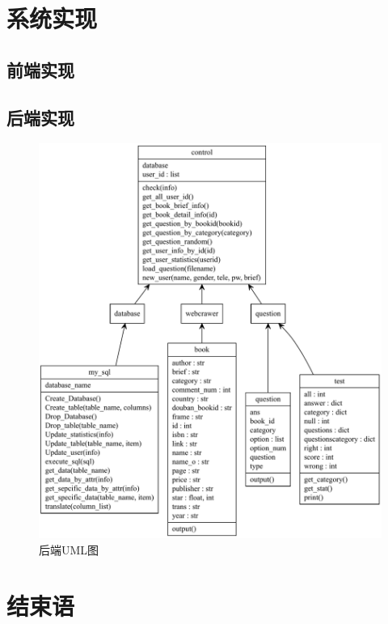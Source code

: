 \documentclass[twoside,11pt]{article}
\begin{document}
\section{系统实现}
\subsection{前端实现}
\subsection{后端实现}

\begin{figure}[htbp]
    \includegraphics[width=1\columnwidth]{figures/backenduml.pdf}
    \caption{后端UML图}
    \label{fig:backenduml}
\end{figure}

\newpage
\section{结束语}
\end{document}
